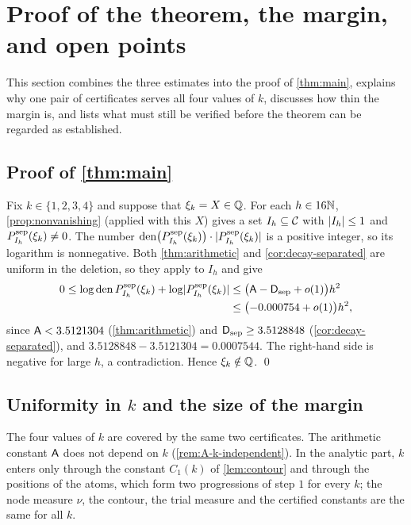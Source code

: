 \section{Proof of the theorem, the margin, and open points}\label{sec:proof}

This section combines the three estimates into the proof of \cref{thm:main}, explains why one
pair of certificates serves all four values of $k$, discusses how thin the margin is, and lists
what must still be verified before the theorem can be regarded as established.

\subsection{Proof of \texorpdfstring{\cref{thm:main}}{Theorem 1.1}}\label{subsec:main-proof}

Fix $k\in\{1,2,3,4\}$ and suppose that $\xi_k=X\in\mathbb{Q}$. For each $h\in16\mathbb{N}$,
\cref{prop:nonvanishing} (applied with this $X$) gives a set $I_h\subseteq\mathcal{C}$ with
$\lvert I_h\rvert\le1$ and $P^{\mathrm{sep}}_{I_h}(\xi_k)\ne0$. The number
$\operatorname{den}\bigl(P^{\mathrm{sep}}_{I_h}(\xi_k)\bigr)\cdot\lvert P^{\mathrm{sep}}_{I_h}(\xi_k)\rvert$ is a positive integer, so
its logarithm is nonnegative. Both \cref{thm:arithmetic} and \cref{cor:decay-separated} are
uniform in the deletion, so they apply to $I_h$ and give
\begin{align*}
  0\le\log\operatorname{den} P^{\mathrm{sep}}_{I_h}(\xi_k)+\log\lvert P^{\mathrm{sep}}_{I_h}(\xi_k)\rvert
   &\le\bigl(\mathsf{A}-\mathsf{D}_{\mathrm{sep}}+o(1)\bigr)h^2\\
   &\le\bigl(-0.000754+o(1)\bigr)h^2,
\end{align*}
since $\mathsf{A}<3.5121304$ (\cref{thm:arithmetic}) and $\mathsf{D}_{\mathrm{sep}}\ge3.5128848$
(\cref{cor:decay-separated}), and $3.5128848-3.5121304=0.0007544$. The right-hand side is negative
for large $h$, a contradiction. Hence $\xi_k\notin\mathbb{Q}$. \qed

\subsection{Uniformity in \texorpdfstring{$k$}{k} and the size of the margin}\label{subsec:margin}

The four values of $k$ are covered by the same two certificates. The arithmetic constant $\mathsf{A}$
does not depend on $k$ (\cref{rem:A-k-independent}). In the analytic part, $k$ enters only
through the constant $C_1(k)$ of \cref{lem:contour} and through the positions of the atoms, which
form two progressions of step $1$ for every $k$; the node measure $\nu$, the contour, the trial
measure and the certified constants are the same for all $k$.

